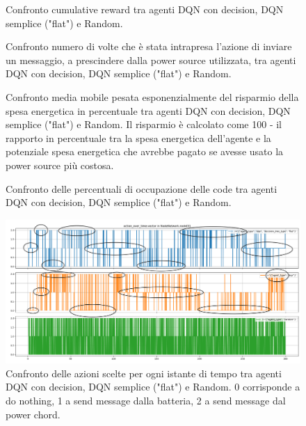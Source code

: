 \documentclass[conference]{IEEEtran}
\begin{document}
\begin{figure}
    \centering
    
    \caption{Confronto cumulative reward tra agenti DQN con decision, DQN semplice ("flat") e Random.}
    \label{fig:cumulative_reward_dqnDeep_dqnFlat_random_defaultConfig}
\end{figure}
\begin{figure}
    \centering
    
    \caption{Confronto numero di volte che è stata intrapresa l'azione di inviare un messaggio, a prescindere dalla power source utilizzata, tra agenti DQN con decision, DQN semplice ("flat") e Random.}
    \label{fig:sendCount_allAgents_defaultConfig}
\end{figure}
\begin{figure}
    \centering
    
    \caption{Confronto media mobile pesata esponenzialmente del risparmio della spesa energetica in percentuale tra agenti DQN con decision, DQN semplice ("flat") e Random. Il risparmio è calcolato come 100 - il rapporto in percentuale tra la spesa energetica dell'agente e la potenziale spesa energetica che avrebbe pagato se avesse usato la power source più costosa.}
    \label{fig:energySaving_defaultConfig_allAgents}
\end{figure}
\begin{figure}
    \centering
    
    \caption{Confronto delle percentuali di occupazione delle code tra agenti DQN con decision, DQN semplice ("flat") e Random.}
    \label{fig:occupancies_allAgents_defaultConfig}
\end{figure}
\begin{figure}
    \centering
    \includegraphics[width=\textwidth]{figs/results_charts/actionOverTime_allAgents_defaultConfig_annotated.png}
    \caption{Confronto delle azioni scelte per ogni istante di tempo tra agenti DQN con decision, DQN semplice ("flat") e Random. 0 corrisponde a do nothing, 1 a send message dalla batteria, 2 a send message dal power chord.}
    \label{fig:actionOverTime_allAgents_defaultConfig_annotated}
\end{figure}
\end{document}
